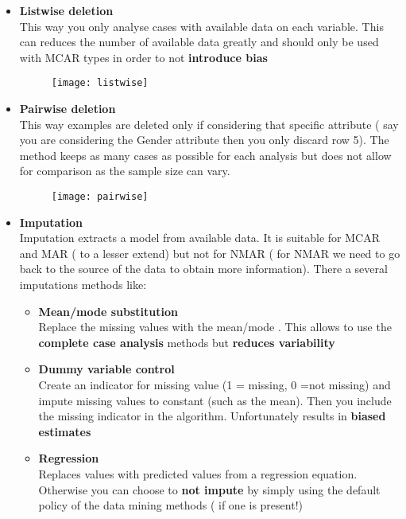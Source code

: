 \begin{itemize}
\item \textbf{Listwise deletion}\\
This way you only analyse cases with available data on each variable. This can reduces the number of available data greatly and should only be used with MCAR types in order to not \textbf{introduce bias}
\begin{figure}[H]
  \centering
  \texttt{[image: listwise]}
\end{figure}
\item \textbf{Pairwise deletion}\\
This way examples are deleted only if considering that specific attribute ( say you are considering the Gender attribute then you only discard row 5). The method keeps as many cases as possible for each analysis but does not allow for comparison as the sample size can vary.
\begin{figure}[H]
  \centering
  \texttt{[image: pairwise]}
\end{figure}
\item \textbf{Imputation}\\
Imputation extracts a model from available data. It is suitable for MCAR and MAR ( to a lesser extend) but not for NMAR ( for NMAR we need to go back to the source of the data to obtain more information). There a several imputations methods like:
\begin{itemize}
\item \textbf{Mean/mode substitution}\\
Replace the missing values with the mean/mode . This allows to use the \textbf{complete case analysis} methods but \textbf{reduces variability}
\item \textbf{Dummy variable control}\\
Create an indicator for missing value (1 = missing, 0 =not missing) and impute missing values to constant (such as the mean). Then you include the missing indicator in the algorithm. Unfortunately results in \textbf{biased estimates} 
\item \textbf{Regression}\\
Replaces values with predicted values from a regression equation.\\
Otherwise you can choose to \textbf{not impute} by simply using the default policy of the data mining methods ( if one is present!)
\end{itemize}
\end{itemize}

